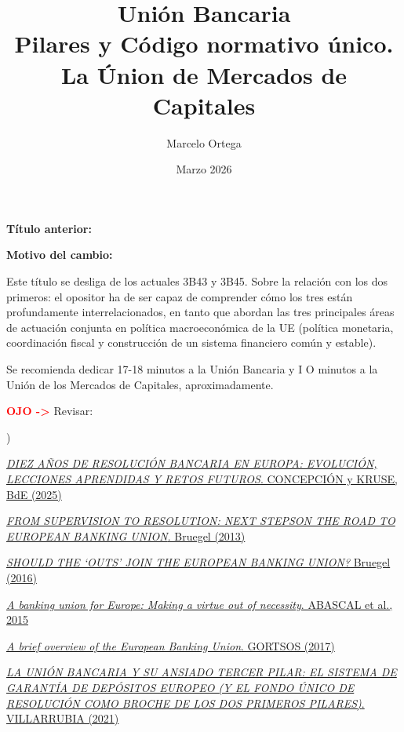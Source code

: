\documentclass[10pt,a4paper]{article}
\title{Unión Bancaria\\
\large Pilares y Código normativo único. La Únion de Mercados de Capitales}
\author{Marcelo Ortega}
\date{Marzo 2026}
\newcounter{alphaitem}
\newcommand{\puntosclave}[1]{%
  \begin{tcolorbox}[
    colframe=black,
    title={Puntos clave},
    before upper={\setlength{\parindent}{0.5cm}\setlength{\parskip}{0.5\baselineskip}}
  ]
  #1
  \end{tcolorbox}
}
\newcommand{\modificaciones}[1]{
  \begin{tcolorbox}[
    colback=white,
    colframe=red,
    title={Modificaciones a realizar},
    before upper={\setlength{\parindent}{0.5cm}\setlength{\parskip}{0.5\baselineskip}}
  ]
  #1
  \end{tcolorbox}
}
\newenvironment{la}
      {\begin{list}{\alph{alphaitem})}{%
          \usecounter{alphaitem}%
          \setlength{\leftmargin}{1cm}%
          \setlength{\parskip}{3pt}%
          \setlength{\itemsep}{0pt}%
          \setlength{\parsep}{0pt}%
      }}
      {\end{list}}
\newcommand{\changebox}{%
\begin{tcolorbox}[title={Historial de cambios del tema}]
\textbf{Título anterior:} \OldTitle\par
\textbf{Motivo del cambio:} \ChangeWhy
\end{tcolorbox}
}
\begin{document}
\maketitle
\changebox

\newpage

\puntosclave{ %
     Este título se desliga de los actuales 3B43 y 3B45. Sobre la relación con los dos primeros: el opositor ha de ser capaz de comprender cómo los tres están profundamente interrelacionados, en tanto que abordan las tres principales áreas de actuación conjunta en política macroeconómica de la UE (política monetaria, coordinación fiscal y construcción de un sistema financiero común y estable).

     Se recomienda dedicar 17-18 minutos a la Unión Bancaria y I O minutos a la Unión de los Mercados de Capitales, aproximadamente.
    }
\vspace{1cm}

\modificaciones{
    \textcolor{red}{\textbf{OJO ->}} Revisar:
    \begin{la}
        \item \href{https://www.bde.es/f/webbe/GAP/Secciones/Publicaciones/InformesBoletinesRevistas/RevistaEstabilidadFinanciera/26/4_REF50_RESOLUCION.pdf}{\textit{DIEZ AÑOS DE RESOLUCIÓN BANCARIA EN EUROPA: EVOLUCIÓN, LECCIONES APRENDIDAS Y RETOS FUTUROS}. CONCEPCIÓN y KRUSE, BdE (2025)}
        \item \href{https://www.bruegel.org/system/files/wp_attachments/pc_2013_05.pdf}{\textit{FROM SUPERVISION TO RESOLUTION: NEXT STEPSON THE ROAD TO EUROPEAN BANKING UNION}. Bruegel (2013)}
        \item \href{https://www.bruegel.org/system/files/wp_attachments/pc_2016_03.pdf}{\textit{SHOULD THE ‘OUTS’ JOIN THE EUROPEAN BANKING UNION?} Bruegel (2016)}
        \item \href{https://www.elsevier.es/en-revista-the-spanish-review-financial-economics-332-pdf-S2173126815000042}{\textit{A banking union for Europe: Making a virtue out of necessity}. ABASCAL et al., 2015}
        \item \href{https://shs.cairn.info/revue-l-europe-en-formation-2017-2-page-61?lang=en}{\textit{A brief overview of the European Banking Union}. GORTSOS (2017)}
        \item \href{https://www.google.es/url?sa=t&source=web&rct=j&opi=89978449&url=https://turia.uv.es/index.php/RDSFin/es/article/view/32884&ved=2ahUKEwiTzNexpf2VAxWnVaQEHUIgEE4QFnoECB4QAQ&usg=AOvVaw3fSPZWkT-Ugw0eY2muzjkQ}{\textit{LA UNIÓN BANCARIA Y SU ANSIADO TERCER PILAR: EL SISTEMA DE GARANTÍA DE DEPÓSITOS EUROPEO (Y EL FONDO ÚNICO DE RESOLUCIÓN COMO BROCHE DE LOS DOS PRIMEROS PILARES)}. VILLARRUBIA (2021)}
    \end{la}
    }
\end{document}
